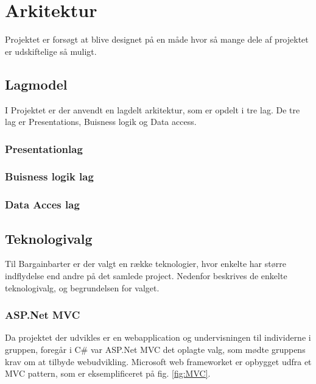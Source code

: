 \chapter{Arkitektur}
 Projektet er forsøgt at blive designet på en måde hvor så mange dele af projektet er udskiftelige så muligt.

\section{Lagmodel}
I Projektet er der anvendt en lagdelt arkitektur, som er opdelt i tre lag. De tre lag er Presentations, Buisness logik  og Data access.  

\subsection{Presentationlag}
\subsection{Buisness logik lag}
\subsection{Data Acces lag}





\section{Teknologivalg}

Til Bargainbarter er der valgt en række teknologier, hvor enkelte har større indflydelse end andre på det samlede project. Nedenfor beskrives de enkelte teknologivalg, og begrundelsen for valget.

\subsection{ASP.Net MVC}
Da projektet der udvikles er en webapplication og undervisningen til individerne i gruppen, foregår i C\# var ASP.Net MVC det oplagte valg, som mødte gruppens krav om at tilbyde webudvikling. Microsoft web frameworket er opbygget udfra et MVC pattern, som er eksemplificeret på fig. \ref{fig:MVC}.

